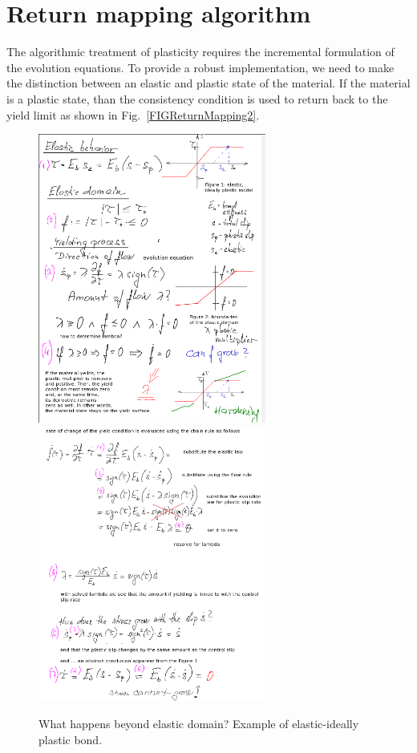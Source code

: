 \documentclass[main.tex]{subfiles}
\begin{document}
\section{Return mapping algorithm}

The algorithmic treatment of plasticity requires the incremental formulation 
of the evolution equations. To provide a robust implementation, 
we need to make the distinction between an elastic and plastic state of the material.
If the material is a plastic state, than the consistency condition is used
to return back to the yield limit as shown in Fig.~\ref{FIGReturnMapping2}.

\begin{figure}[ht]
	\centering
  \includegraphics[width=7.5cm]{drawings/plasticity_how_much_yielding.png}
  \includegraphics[width=7.5cm]{drawings/plasticity_how_much_yielding2.png}
	\caption{What happens beyond elastic domain? Example of elastic-ideally plastic bond.}
	\label{FIGReturnMapping1}
\end{figure}
\end{document}
